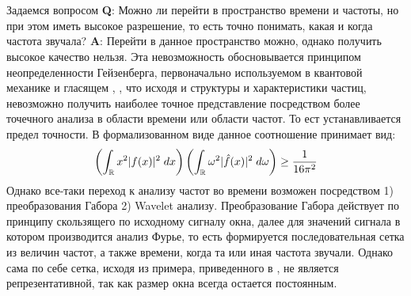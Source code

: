  \label{link::wavelet_analysis}
\\\\
\indent Задаемся вопросом \textbf{Q}: Можно ли перейти в пространство времени и частоты, но при этом иметь высокое разрешение, то есть точно понимать, какая и когда частота звучала? \textbf{A}: Перейти в данное пространство можно, однако получить высокое качество нельзя. Эта невозможность обосновывается принципом неопределенности Гейзенберга, первоначально используемом в квантовой механике и гласящем \cite{busch2007heisenberg}, \cite{brunton2022data}, что исходя и структуры и характеристики частиц, невозможно получить наиболее точное представление посредством более точечного анализа в области времени или области частот. То ест устанавливается предел точности. В формализованном виде данное соотношение принимает вид:
\begin{equation}
	\left(\int_{\mathbb{R}}x^2 |f(x)|^2 \; dx \right) \left(\int_{\mathbb{R}}\omega^2 |\hat{f}(x)|^2 \; d \omega \right) \ge \frac{1}{16 \pi^2}
\end{equation}
Однако все-таки переход к анализу частот во времени возможен посредством 1) преобразования Габора \cite{brunton2022data} 2) Wavelet анализу. Преобразование Габора действует по принципу скользящего по исходному сигналу окна, далее для значений сигнала в котором производится анализ Фурье, то есть формируется последовательная сетка из величин частот, а также времени, когда та или иная частота звучали. Однако сама по себе сетка, исходя из примера, приведенного в \cite{brunton2022data}, не является репрезентативной, так как размер окна всегда остается постоянным. 

